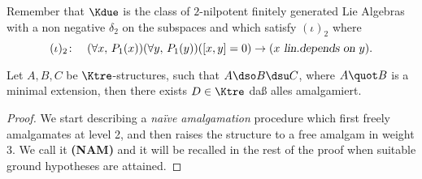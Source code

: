 Remember that $\Kdue$ is the class of $2$-nilpotent finitely generated
Lie Algebras with a non negative $\delta_{2}$
on the subspaces and which satisfy
$(\iota)_{2}$ where
$$(\iota)_{2}\colon\quad(\forall x,\,P_{1}(x))(\forall y,\,P_{1}(y))([x,y]= 0)\rightarrow
(\textsl{$x$ lin.{}depends on $y$}).$$

\begin{lem}
Let $A,B,C$ be $\Ktre$-structures, such that $A\dso B\dsu C$, where $A\quot B$ is a minimal extension,
then there exists $D\in\Ktre$ da{\ss} alles amalgamiert.
\end{lem}
\begin{proof}
We start describing a \emph{na\"{i}ve amalgamation} procedure which first freely amalgamates at level 2, and then raises the structure to a free amalgam in weight 3.
We call it {\bf (NAM)} and it will be recalled in the rest of the proof when suitable ground hypotheses are attained.


\end{proof}
